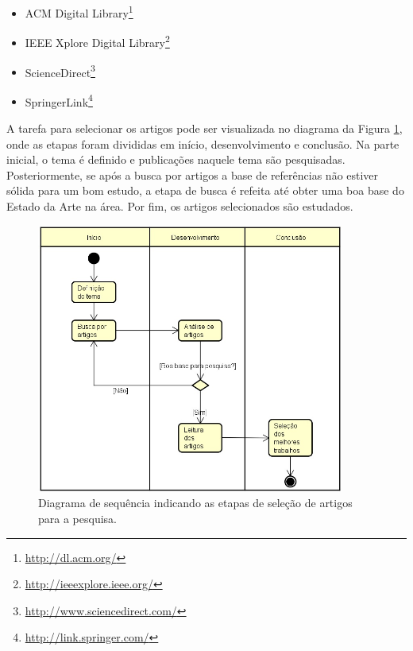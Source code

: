 \documentclass[smallextended]{svjour3}
\begin{document}
\begin{itemize}
	\item \textsf{ACM Digital Library}\footnote{\url{http://dl.acm.org/}}
	
	\item \textsf{IEEE Xplore Digital Library}\footnote{\url{http://ieeexplore.ieee.org/}}
	
	\item \textsf{ScienceDirect}\footnote{\url{http://www.sciencedirect.com/}} 	
	
	\item \textsf{SpringerLink}\footnote{\url{http://link.springer.com/}}
\end{itemize}

A tarefa para selecionar os artigos pode ser visualizada no diagrama da Figura \ref{fig:diagrama}, onde as etapas foram divididas em início, desenvolvimento e conclusão. Na parte inicial, o tema é definido e publicações naquele tema são pesquisadas. Posteriormente, se após a busca por artigos a base de referências não estiver sólida para um bom estudo, a etapa de busca é refeita até obter uma boa base do Estado da Arte na área. Por fim, os artigos selecionados são estudados. 

\begin{figure}[!ht]
	\centering
	\includegraphics[width=0.9\textwidth]{imagens/diagrama.jpg}
	\caption{Diagrama de sequência indicando as etapas de seleção de artigos para a pesquisa.}
	\label{fig:diagrama}
\end{figure}
\end{document}
